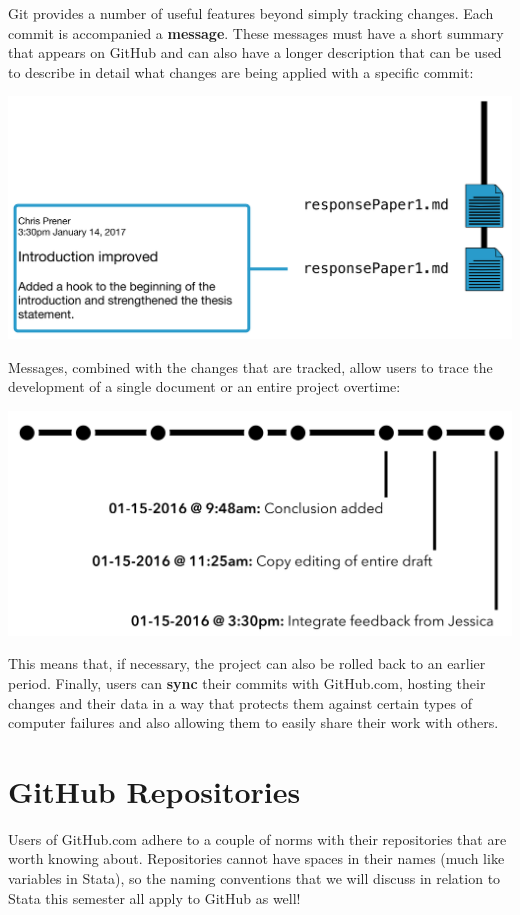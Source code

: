 \documentclass[]{book}
\theoremstyle{definition}
\theoremstyle{definition}
\theoremstyle{definition}
\theoremstyle{remark}
\begin{document}
Git provides a number of useful features beyond simply tracking changes.
Each commit is accompanied a \textbf{message}. These messages must have
a short summary that appears on GitHub and can also have a longer
description that can be used to describe in detail what changes are
being applied with a specific commit:

\includegraphics[width=1\linewidth]{images/gitFlow03}

Messages, combined with the changes that are tracked, allow users to
trace the development of a single document or an entire project
overtime:

\includegraphics[width=1\linewidth]{images/gitFlow04}

This means that, if necessary, the project can also be rolled back to an
earlier period. Finally, users can \textbf{sync} their commits with
GitHub.com, hosting their changes and their data in a way that protects
them against certain types of computer failures and also allowing them
to easily share their work with others.

\section{GitHub Repositories}\label{github-repositories}

Users of GitHub.com adhere to a couple of norms with their repositories
that are worth knowing about. Repositories cannot have spaces in their
names (much like variables in Stata), so the naming conventions that we
will discuss in relation to Stata this semester all apply to GitHub as
well!
\end{document}
